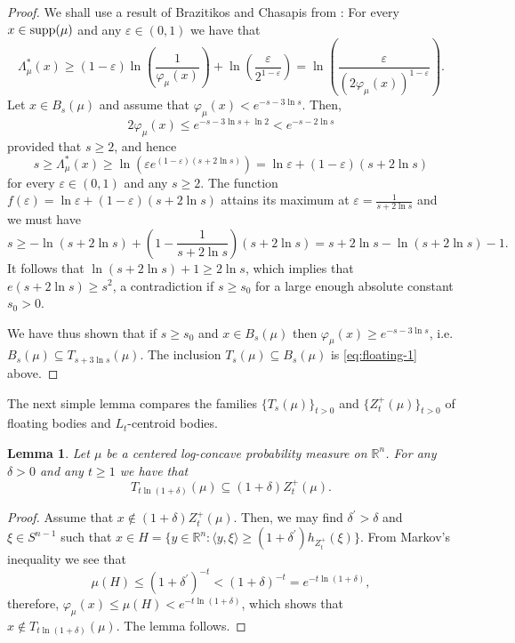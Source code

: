 \documentclass[11pt,leqno]{article}
\newtheorem{lemma}[theorem]{Lemma}
\theoremstyle{definition}
\theoremstyle{remark}
\numberwithin{equation}{section}
\newcommand{\ls}{\leqslant}
\newcommand{\gr}{\geqslant}
\newcommand{\1}{\textbf{1}}
\begin{document}
\begin{proof}We shall use a result of Brazitikos and Chasapis from \cite{Brazitikos-Chasapis-2024}: For every $x\in {\rm supp}(\mu)$
and any $\varepsilon\in (0,1)$ we have that
$$\Lambda_{\mu}^{\ast}(x)\gr (1-\varepsilon)\ln\left(\frac{1}{\varphi_{\mu}(x)}\right)
+\ln\left(\frac{\varepsilon}{2^{1-\varepsilon}}\right)=\ln\left(\frac{\varepsilon}{(2\varphi_{\mu}(x))^{1-\varepsilon}}\right).$$
Let $x\in B_s(\mu)$ and assume that $\varphi_{\mu}(x)<e^{-s-3\ln s}$. Then,
$$2\varphi_{\mu}(x)\ls e^{-s-3\ln s+\ln 2}<e^{-s-2\ln s}$$
provided that $s\gr 2$, and hence
$$s\gr \Lambda_{\mu}^{\ast}(x)\gr \ln\left(\varepsilon e^{(1-\varepsilon)(s+2\ln s)}\right)
=\ln\varepsilon +(1-\varepsilon)(s+2\ln s)$$
for every $\varepsilon\in (0,1)$ and any $s\gr 2$. The function $f(\varepsilon)=\ln\varepsilon +(1-\varepsilon)(s+2\ln s)$
attains its maximum at $\varepsilon =\frac{1}{s+2\ln s}$ and we must have
$$s\gr -\ln(s+2\ln s)+\left(1-\frac{1}{s+2\ln s}\right)(s+2\ln s)=s+2\ln s-\ln(s+2\ln s)-1.$$
It follows that $\ln(s+2\ln s)+1\gr 2\ln s$, which implies that $e(s+2\ln s)\gr s^2$, a contradiction if
$s\gr s_0$ for a large enough absolute constant $s_0>0$.

We have thus shown that if $s\gr s_0$ and $x\in B_s(\mu)$ then $\varphi_{\mu}(x)\gr e^{-s-3\ln s}$, i.e.
$B_s(\mu)\subseteq T_{s+3\ln s}(\mu)$. The inclusion $T_s(\mu)\subseteq B_s(\mu)$ is \eqref{eq:floating-1} above.
\end{proof}

The next simple lemma compares the families $\{T_s(\mu)\}_{t>0}$ and $\{Z_t^+(\mu)\}_{t>0}$ of floating bodies and $L_t$-centroid bodies.

\begin{lemma}\label{lem:floating-2}Let $\mu$ be a centered log-concave probability measure on $\mathbb{R}^n$.
For any $\delta>0$ and any $t\gr 1$ we have that
$$T_{t\ln(1+\delta)}(\mu)\subseteq (1+\delta)Z_t^+(\mu).$$
\end{lemma}

\begin{proof}Assume that $x\notin (1+\delta)Z_t^+(\mu)$. Then, we may find $\delta^{\prime}>\delta$ and $\xi\in S^{n-1}$ such that
$x\in H=\{y\in\mathbb{R}^n:\langle y,\xi\rangle \gr (1+\delta^{\prime})h_{Z_t^+}(\xi)\}$. From Markov's inequality we see
that
$$\mu(H)\ls (1+\delta^{\prime})^{-t} <(1+\delta)^{-t}=e^{-t\ln(1+\delta)},$$
therefore, $\varphi_{\mu}(x)\ls\mu(H)< e^{-t\ln(1+\delta)}$, which shows that $x\notin T_{t\ln(1+\delta)}(\mu)$.
The lemma follows.\end{proof}
\end{document}
